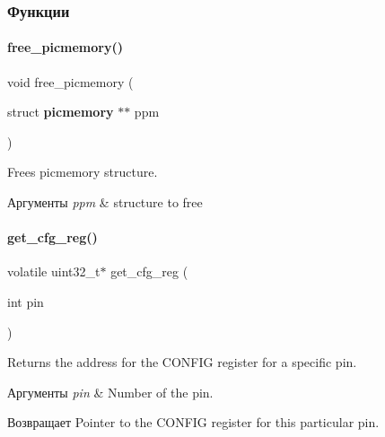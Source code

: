 \subsubsection{Функции}
\mbox{\label{rpp_8c_ae2a5b94e0e38695434b74a82f286f06b}} 
\paragraph{free\+\_\+picmemory()}
{\footnotesize\ttfamily void free\+\_\+picmemory (\begin{DoxyParamCaption}\item[{struct \textbf{ picmemory} $\ast$$\ast$}]{ppm }\end{DoxyParamCaption})}



Frees picmemory structure. 


\begin{DoxyParams}{Аргументы}
{\em ppm} & structure to free \\
\hline
\end{DoxyParams}
\mbox{\label{rpp_8c_af21f1313d2026ae1c24ed7cc567cbef9}} 
\paragraph{get\+\_\+cfg\+\_\+reg()}
{\footnotesize\ttfamily volatile uint32\+\_\+t$\ast$ get\+\_\+cfg\+\_\+reg (\begin{DoxyParamCaption}\item[{int}]{pin }\end{DoxyParamCaption})}



Returns the address for the C\+O\+N\+F\+IG register for a specific pin. 


\begin{DoxyParams}{Аргументы}
{\em pin} & Number of the pin.\\
\hline
\end{DoxyParams}
\begin{DoxyReturn}{Возвращает}
Pointer to the C\+O\+N\+F\+IG register for this particular pin. 
\end{DoxyReturn}
\mbox{\label{rpp_8c_a93d7da45bda8e817ba21c4165863a3bd}} 

